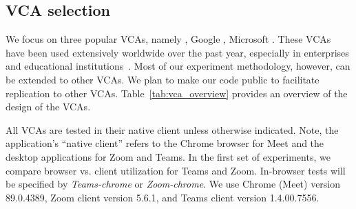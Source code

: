 \subsection{VCA selection} 
We focus on three popular VCAs, namely \zoom, Google \meet, Microsoft \teams. These VCAs have been used extensively worldwide over the past year, especially in enterprises and educational institutions~\cite{vca_share}. Most of our experiment methodology, however, can be extended to other VCAs. We plan to make our code public to facilitate replication to other VCAs. Table~\ref{tab:vca_overview} provides an overview of the design of the VCAs. 

All VCAs are tested in their native client unless otherwise indicated. Note, the application's ``native client'' refers to the Chrome browser for Meet and the desktop applications for Zoom and Teams. In the first set of experiments, we compare browser vs. client utilization for Teams and Zoom. In-browser tests will be specified by \textit{Teams-chrome} or \textit{Zoom-chrome}. We use Chrome (Meet) version 89.0.4389, Zoom client version 5.6.1, and Teams client version 1.4.00.7556.





